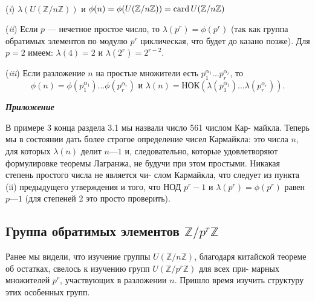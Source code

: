 \documentclass{../template/mai_book}
\begin{document}
\begin{property}
\
 
\par  (\textit{i}) $\lambda(U(\mathbb{Z}/n\mathbb{Z}))$ и $\phi(n)=\phi(U(\mathbb{Z}/n\mathbb{Z}))=\operatorname{card} U(\mathbb{Z}/n\mathbb{Z})$
\par  (\textit{ii}) Если $p$ — нечетное простое число, то $\lambda(p^r) = \phi(p^r)$ (так как
группа обратимых элементов по модулю $p^r$ циклическая, что будет до­
казано позже). Для $p = 2$ имеем: $\lambda(4) = 2$ и $\lambda(2^r) = 2^{r - 2}$.
\par  (\textit{iii}) Если разложение $n$ на простые множители есть $p_1^{\alpha_1}...p_r^{\alpha_r}$, то
$$\phi(n)=\phi(p_1^{\alpha_1})...\phi(p_r^{\alpha_r}) \text{ и } \lambda(n)=\text{НОК}(\lambda(p_1^{\alpha_1})...\lambda(p_r^{\alpha_r})).$$

\end{property}
\begin{beznomera}
\textbf{\textit{Приложение}}

В примере 3 конца раздела 3.1 мы назвали число 561 числом Кар­-\linebreak
майкла. Теперь мы в состоянии дать более строгое определение чисел\linebreak
Кармайкла: это числа $n$, для которых $\lambda(n)$ делит $n — 1$ и, следовательно,\linebreak
которые удовлетворяют формулировке теоремы Лагранжа, не будучи\linebreak
при этом простыми. Никакая степень простого числа не является чи­-\linebreak
слом Кармайкла, что следует из пункта (ii) предыдущего утверждения\linebreak
и того, что НОД $p^r - 1$ и $\lambda(p^r)=\phi(p^r)$ равен $p — 1$ (для степеней 2 это\linebreak
просто проверить).
\end{beznomera}
\newpage
\subsection{Группа обратимых элементов $\mathbb{Z}/p^r\mathbb{Z}$}
\noindent Ранее мы видели, что изучение группы $U(\mathbb{Z}/n\mathbb{Z})$, благодаря китайской\linebreak
теореме об остатках, свелось к изучению групп $U(\mathbb{Z}/p^r\mathbb{Z})$ для всех при-\linebreak
марных множителей $p^r$, участвующих в разложении $n$. Пришло время\linebreak
изучить структуру этих особенных групп.
\end{document}
